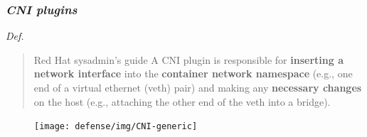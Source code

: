 \begin{frame}
  \frametitle{ \textit{CNI plugins}}
  \vspace{.5em}
  \begin{block}{ \emph{Def.}}
    \begin{quote}{Red Hat sysadmin's guide}
      \vspace{.5em}
      \small
      A CNI plugin is responsible for \alert{\textbf{inserting a network interface}} into the
      \alert{\textbf{container network namespace}} (e.g., one end of a virtual ethernet (veth)
      pair) and making any \alert{\textbf{necessary changes}} on the host (e.g., attaching the
      other end of the veth into a bridge).
    \end{quote}
  \end{block}
  \pause
  \begin{figure}
    \centering
    \texttt{[image: defense/img/CNI-generic]}
  \end{figure}
\end{frame}

